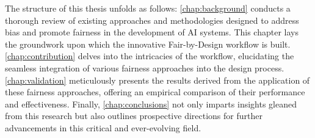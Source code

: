 The structure of this thesis unfolds as follows: \cref{chap:background} conducts a thorough review of existing approaches and methodologies designed to address bias and promote fairness in the development of AI systems. This chapter lays the groundwork upon which the innovative Fair-by-Design workflow is built. \cref{chap:contribution} delves into the intricacies of the workflow, elucidating the seamless integration of various fairness approaches into the design process. \cref{chap:validation} meticulously presents the results derived from the application of these fairness approaches, offering an empirical comparison of their performance and effectiveness. Finally, \cref{chap:conclusions} not only imparts insights gleaned from this research but also outlines prospective directions for further advancements in this critical and ever-evolving field.

